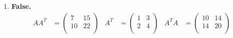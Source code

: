 \documentclass{article}
\begin{document}
\begin{enumerate}

    \item \textbf{False.} \begin{align*}
        AA^T &= \begin{pmatrix}
            7 & 15 \\ 10 & 22 \\
        \end{pmatrix} & A^T &= \begin{pmatrix}
            1 & 3 \\ 2 & 4 \\
        \end{pmatrix} & A^T A &= \begin{pmatrix}
            10 & 14 \\ 14 & 20 \\
        \end{pmatrix}
    \end{align*}


\end{enumerate}
\end{document}

